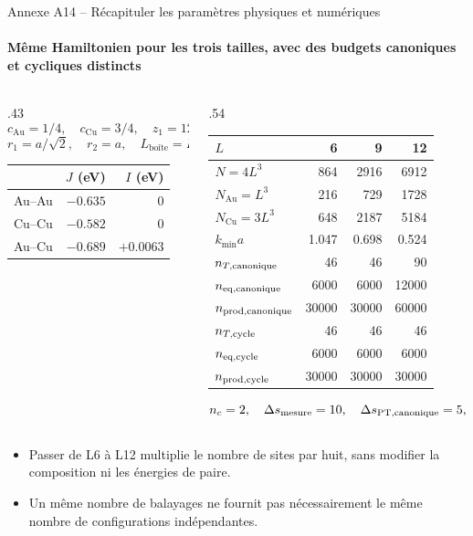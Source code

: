 \documentclass[aspectratio=169,10pt]{beamer}
\newcommand{\Au}{\mathrm{Au}}
\newcommand{\Cu}{\mathrm{Cu}}
\newcommand{\deuxpoints}[2]{\par\smallskip\begin{itemize}\setlength{\itemsep}{2pt}\setlength{\parskip}{0pt}\item #1\item #2\end{itemize}}
\begin{document}
\begin{frame}{Annexe A14 -- Récapituler les paramètres physiques et numériques}
\framesubtitle{Même Hamiltonien pour les trois tailles, avec des budgets canoniques et cycliques distincts}
\begin{columns}[T,onlytextwidth]
\begin{column}{.43\textwidth}
\[
c_{\Au}=1/4,\quad c_{\Cu}=3/4,\quad z_1=12,\quad z_2=6,
\]
\[
r_1=a/\sqrt2,\quad r_2=a,\quad L_{\text{boîte}}=La.
\]
\begin{center}
\begin{tabular}{lrr}\toprule
 & $J$ (eV) & $I$ (eV)\\\midrule
Au--Au & $-0.635$ & 0\\
Cu--Cu & $-0.582$ & 0\\
Au--Cu & $-0.689$ & $+0.0063$\\\bottomrule
\end{tabular}
\end{center}
\end{column}
\begin{column}{.54\textwidth}
\begin{center}
\begin{tabular}{lrrr}\toprule
$L$ & 6 & 9 & 12\\\midrule
$N=4L^3$ & 864 & 2916 & 6912\\
$N_{\Au}=L^3$ & 216 & 729 & 1728\\
$N_{\Cu}=3L^3$ & 648 & 2187 & 5184\\
$k_{\min}a$ & 1.047 & 0.698 & 0.524\\
$n_{T,\rm canonique}$ & 46 & 46 & 90\\
$n_{\rm eq,canonique}$ & 6000 & 6000 & 12000\\
$n_{\rm prod,canonique}$ & 30000 & 30000 & 60000\\
$n_{T,\rm cycle}$ & 46 & 46 & 46\\
$n_{\rm eq,cycle}$ & 6000 & 6000 & 6000\\
$n_{\rm prod,cycle}$ & 30000 & 30000 & 30000\\\bottomrule
\end{tabular}
\end{center}
\[
n_c=2,\quad\Delta s_{\rm mesure}=10,\quad\Delta s_{\rm PT,canonique}=5,\quad n_{\rm PT,cycle}=0.
\]
\end{column}
\end{columns}
\deuxpoints{Passer de L6 à L12 multiplie le nombre de sites par huit, sans modifier la composition ni les énergies de paire.}{Un même nombre de balayages ne fournit pas nécessairement le même nombre de configurations indépendantes.}
\end{frame}
\end{document}

